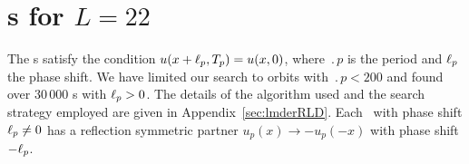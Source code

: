 \section{\Rpo s for $L=22$}
\label{sec:rpos}

The \rpo s satisfy the condition 
$u(x+\ell_p,{T_{p}}) = u(x,0)$,
where $\period{p}$ is the period and $\ell_p$ the phase shift.
We have limited our search to orbits with $\period{p} < 200$ and found
over 30\,000 \rpo s with $\ell_p > 0$.  The details of the algorithm
used and the search strategy employed are given in
Appendix~\ref{sec:lmderRLD}.
Each \rpo\ with phase shift
$\ell_p \neq 0$ has a reflection symmetric partner
$u_p(x) \to -u_p(-x)$ with phase shift $-\ell_p$.


